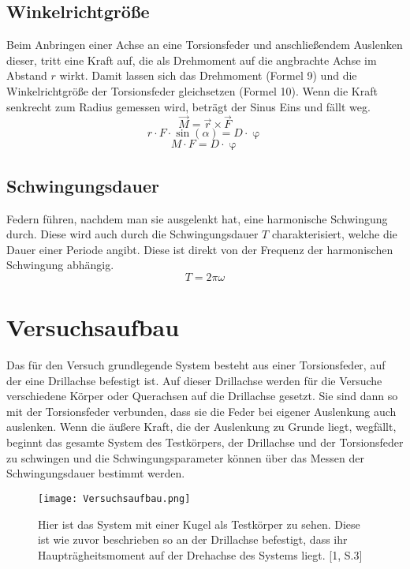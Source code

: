 \documentclass[titlepage = firstcover]{scrartcl}
\begin{document}
      \subsection{Winkelrichtgröße}
      Beim Anbringen einer Achse an eine Torsionsfeder und anschließendem Auslenken dieser, tritt eine Kraft auf, die als Drehmoment auf die angbrachte Achse im Abstand $r$
      wirkt. Damit lassen sich das Drehmoment (Formel 9) und die Winkelrichtgröße der Torsionsfeder gleichsetzen (Formel 10). Wenn die Kraft senkrecht zum Radius gemessen wird,
      beträgt der Sinus Eins und fällt weg.
      \begin{equation}
        \vec{M} = \vec{r} \times \vec{F}
      \end{equation}
      \begin{equation}
        r \cdot F \cdot \sin(\alpha) = D \cdot \upvarphi
      \end{equation}
      \begin{equation*}
        M \cdot F = D \cdot \upvarphi
      \end{equation*} 

      \subsection{Schwingungsdauer}
      Federn führen, nachdem man sie ausgelenkt hat, eine harmonische Schwingung durch. Diese wird auch durch die Schwingungsdauer $T$ charakterisiert,
      welche die Dauer einer Periode angibt. Diese ist direkt von der Frequenz der harmonischen Schwingung abhängig.
      \begin{equation*}
        T = 2\pi \omega
      \end{equation*}
    
    \section{Versuchsaufbau}
      Das für den Versuch grundlegende System besteht aus einer Torsionsfeder, auf der eine Drillachse befestigt ist. Auf dieser Drillachse werden für die Versuche
      verschiedene Körper oder Querachsen auf die Drillachse gesetzt. Sie sind dann so mit der Torsionsfeder verbunden, dass sie die Feder bei eigener Auslenkung auch
      auslenken. Wenn die äußere Kraft, die der Auslenkung zu Grunde liegt, wegfällt, beginnt das gesamte System des Testkörpers, der Drillachse und der 
      Torsionsfeder zu schwingen und die Schwingungsparameter können über das Messen der Schwingungsdauer bestimmt werden.
      \newpage
      \begin{figure}[h]
        \centering
        \texttt{[image: Versuchsaufbau.png]}
        \caption{Hier ist das System mit einer Kugel als Testkörper zu sehen. Diese ist wie zuvor beschrieben so an der Drillachse befestigt, dass ihr Haupträgheitsmoment auf der Drehachse des Systems liegt. [1, S.3]}
      \end{figure}
\end{document}

